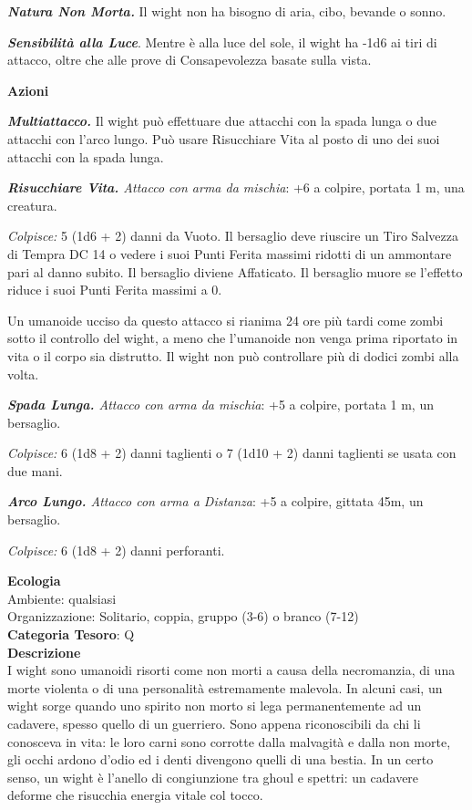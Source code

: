 \begin{multicols}{2}
{\emph{\textbf{Natura Non Morta.}} Il wight non ha bisogno di aria, cibo, bevande o sonno.

\emph{\textbf{Sensibilità alla Luce}}. Mentre è alla luce del sole, il wight ha -1d6 ai tiri di attacco, oltre che alle prove di Consapevolezza basate sulla vista.

\textbf{Azioni}

\emph{\textbf{Multiattacco.}} Il wight può effettuare due attacchi con la spada lunga o due attacchi con l'arco lungo. Può usare Risucchiare Vita al posto di uno dei suoi attacchi con la spada lunga.

\emph{\textbf{Risucchiare Vita.} Attacco con arma da mischia}: +6 a colpire, portata 1 m, una creatura.

\emph{Colpisce:} 5 (1d6 + 2) danni da Vuoto. Il bersaglio deve riuscire un Tiro Salvezza di Tempra DC 14 o vedere i suoi Punti Ferita massimi ridotti di un ammontare pari al danno subito. Il bersaglio diviene Affaticato. Il bersaglio muore se l'effetto riduce i suoi Punti Ferita massimi a 0.

Un umanoide ucciso da questo attacco si rianima 24 ore più tardi come zombi sotto il controllo del wight, a meno che l'umanoide non venga prima riportato in vita o il corpo sia distrutto. Il wight non può controllare più di dodici zombi alla volta.

\emph{\textbf{Spada Lunga.} Attacco con arma da mischia}: +5 a colpire, portata 1 m, un bersaglio.

\emph{Colpisce:} 6 (1d8 + 2) danni taglienti o 7 (1d10 + 2) danni taglienti se usata con due mani.

\emph{\textbf{Arco Lungo.} Attacco con arma a Distanza}: +5 a colpire, gittata 45m, un bersaglio.

\emph{Colpisce:} 6 (1d8 + 2) danni perforanti.

\textbf{Ecologia}\\
Ambiente: qualsiasi\\
Organizzazione: Solitario, coppia, gruppo (3-6) o branco (7-12)\\
\textbf{Categoria Tesoro}: Q\\
\textbf{Descrizione}\\
I wight sono umanoidi risorti come non morti a causa della necromanzia, di una morte violenta o di una personalità estremamente malevola. In alcuni casi, un wight sorge quando uno spirito non morto si lega permanentemente ad un cadavere, spesso quello di un guerriero. Sono appena riconoscibili da chi li conosceva in vita: le loro carni sono corrotte dalla malvagità e dalla non morte, gli occhi ardono d'odio ed i denti divengono quelli di una bestia. In un certo senso, un wight è l'anello di congiunzione tra ghoul e spettri: un cadavere deforme che risucchia energia vitale col tocco.

}
\end{multicols}
